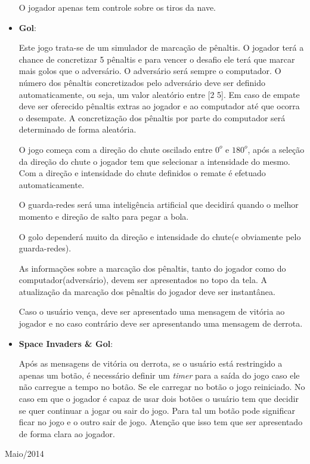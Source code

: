 \documentclass[a4paper,11pt]{article}
\newcommand{\sepitem}{\vspace{0.1in}\item}
\begin{document}
\begin{itemize}
O jogador apenas tem controle sobre os tiros da nave.

\sepitem \textbf{Gol}:

Este jogo trata-se de um simulador de marcação de pênaltis. O jogador terá a chance de concretizar 5 pênaltis e para vencer o desafio ele terá que
marcar mais golos que o adversário. O adversário será sempre o computador. O número dos pênaltis concretizados pelo adversário deve ser definido
automaticamente, ou seja, um valor aleatório entre [2 5]. Em caso de empate deve ser oferecido pênaltis extras ao jogador e ao computador até que
ocorra o desempate. A concretização dos pênaltis por parte do computador será determinado de forma aleatória.

O jogo começa com a direção do chute oscilado entre $0^o$ e $180^o$, após a seleção da direção do chute o jogador tem que selecionar a intensidade do mesmo.
Com a direção e intensidade do chute definidos o remate é efetuado automaticamente.

O guarda-redes será uma inteligência artificial que decidirá quando o melhor momento e direção de salto para pegar a bola.

O golo dependerá muito da direção e intensidade do chute(e obviamente pelo guarda-redes).

As informações sobre a marcação dos pênaltis, tanto do jogador como do computador(adversário), devem ser apresentados no topo da tela. A atualização
da marcação dos pênaltis do jogador deve ser instantânea.

Caso o usuário vença, deve ser apresentado uma mensagem de vitória ao jogador e no caso contrário deve ser apresentando uma mensagem de derrota.

\sepitem \textbf{Space Invaders \& Gol}:

Após as mensagens de vitória ou derrota, se o usuário está restringido a apenas um botão, é necessário definir um {\it timer} para a saída do jogo caso ele
não carregue a tempo no botão. Se ele carregar no botão o jogo reiniciado. No caso em que o jogador é capaz de usar dois botões o usuário tem que decidir
se quer continuar a jogar ou sair do jogo. Para tal um botão pode significar ficar no jogo e o outro sair de jogo. Atenção que isso tem que ser apresentado
de forma clara ao jogador.

\end{itemize}
\vfill

\raggedleft
{\sc Maio/2014}
\end{document}
